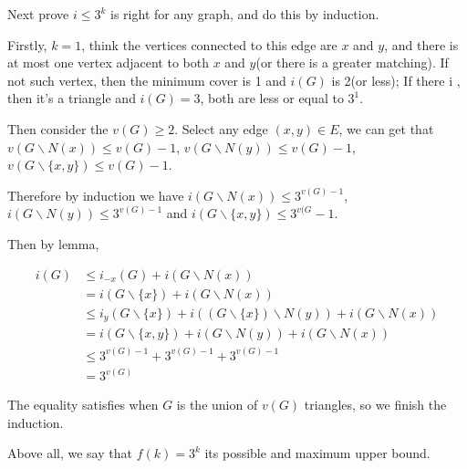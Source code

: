 \documentclass{article}
\begin{document}
Next prove $i \leqslant 3^k$ is right for any graph, and do this by induction.

Firstly, $k=1$, think the vertices connected to this edge are $x$ and $y$, and there is at most one vertex adjacent to both $x$ and $y$(or there is a greater matching). If not such vertex, then the minimum cover is 1 and $i(G)$ is 2(or less); If there i
, then it's a triangle and $i(G) = 3$, both are less or equal to $3^1$.

Then consider the $v(G) \geqslant 2$. Select any edge $(x,y) \in E$, we can get that $v(G\backslash N(x)) \leqslant v(G) - 1$, $v(G \backslash N(y)) \leqslant v(G) - 1$, $v(G \backslash \{ x,y \}) \leqslant v(G) - 1$.

Therefore by induction we have $i(G\backslash N(x)) \leqslant 3^{v(G)-1}$, $i(G\backslash N(y)) \leqslant 3^{v(G) - 1}$ and $i(G \backslash  \{ x,y\}) \leqslant 3^{v(G} - 1$.

Then by lemma,

\begin{align*}
    i(G) & \leqslant i_{-x}(G) + i(G \backslash N(x))\\
    &= i(G \backslash  \{ x\} ) + i(G\backslash  N(x))\\
    &\leqslant i_{y}(G\backslash \{ x \}) + i((G\backslash \{x\}) \backslash N(y) ) + i(G\backslash N(x))\\
    &= i (G\backslash \{x, y\}) + i(G\backslash N(y)) + i(G\backslash N(x))\\
    &\leqslant 3^{v(G) - 1} + 3^{v(G) - 1} + 3^{v(G) - 1}\\
    & = 3^{v(G)}
\end{align*}

The equality satisfies when $G$ is the union of $v(G)$ triangles, so we finish the induction.

Above all, we say that $f(k) = 3^k$ its possible and maximum upper bound.
\end{document}
